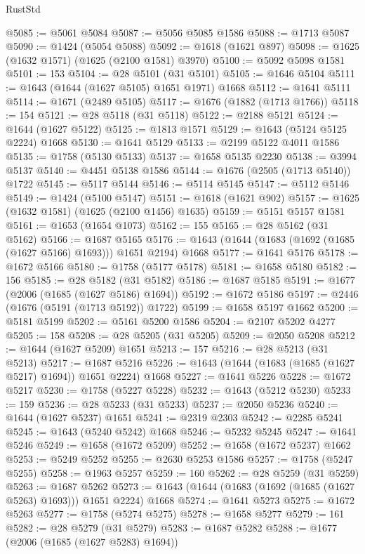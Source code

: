 \begin{lexlean}{RustStd}
\begin{coremodule}
@5085 := @5061 @5084
@5087 := @5056 @5085 @1586
@5088 := @1713 @5087
@5090 := @1424 (@5054 @5088)
@5092 := @1618 (@1621 @897)
@5098 := @1625 (@1632 @1571) (@1625 (@2100 @1581) @3970)
@5100 := @5092 @5098 @1581
@5101 := 153
@5104 := @28 @5101 (@31 @5101)
@5105 := @1646 @5104
@5111 := @1643 (@1644 (@1627 @5105) @1651 @1971) @1668
@5112 := @1641 @5111
@5114 := @1671 (@2489 @5105)
@5117 := @1676 (@1882 (@1713 @1766))
@5118 := 154
@5121 := @28 @5118 (@31 @5118)
@5122 := @2188 @5121
@5124 := @1644 (@1627 @5122)
@5125 := @1813 @1571
@5129 := @1643 (@5124 @5125 @2224) @1668
@5130 := @1641 @5129
@5133 := @2199 @5122 @4011 @1586
@5135 := @1758 (@5130 @5133)
@5137 := @1658 @5135 @2230
@5138 := @3994 @5137
@5140 := @4451 @5138 @1586
@5144 := @1676 (@2505 (@1713 @5140)) @1722
@5145 := @5117 @5144
@5146 := @5114 @5145
@5147 := @5112 @5146
@5149 := @1424 (@5100 @5147)
@5151 := @1618 (@1621 @902)
@5157 := @1625 (@1632 @1581) (@1625 (@2100 @1456) @1635)
@5159 := @5151 @5157 @1581
@5161 := @1653 (@1654 @1073)
@5162 := 155
@5165 := @28 @5162 (@31 @5162)
@5166 := @1687 @5165
@5176 := @1643 (@1644 (@1683 (@1692 (@1685 (@1627 @5166) @1693))) @1651 @2194) @1668
@5177 := @1641 @5176
@5178 := @1672 @5166
@5180 := @1758 (@5177 @5178)
@5181 := @1658 @5180
@5182 := 156
@5185 := @28 @5182 (@31 @5182)
@5186 := @1687 @5185
@5191 := @1677 (@2006 (@1685 (@1627 @5186) @1694))
@5192 := @1672 @5186
@5197 := @2446 (@1676 (@5191 (@1713 @5192)) @1722)
@5199 := @1658 @5197 @1662
@5200 := @5181 @5199
@5202 := @5161 @5200 @1586
@5204 := @2107 @5202 @4277
@5205 := 158
@5208 := @28 @5205 (@31 @5205)
@5209 := @2050 @5208
@5212 := @1644 (@1627 @5209) @1651
@5213 := 157
@5216 := @28 @5213 (@31 @5213)
@5217 := @1687 @5216
@5226 := @1643 (@1644 (@1683 (@1685 (@1627 @5217) @1694)) @1651 @2224) @1668
@5227 := @1641 @5226
@5228 := @1672 @5217
@5230 := @1758 (@5227 @5228)
@5232 := @1643 (@5212 @5230)
@5233 := 159
@5236 := @28 @5233 (@31 @5233)
@5237 := @2050 @5236
@5240 := @1644 (@1627 @5237) @1651
@5241 := @2319 @2303
@5242 := @2285 @5241
@5245 := @1643 (@5240 @5242) @1668
@5246 := @5232 @5245
@5247 := @1641 @5246
@5249 := @1658 (@1672 @5209)
@5252 := @1658 (@1672 @5237) @1662
@5253 := @5249 @5252
@5255 := @2630 @5253 @1586
@5257 := @1758 (@5247 @5255)
@5258 := @1963 @5257
@5259 := 160
@5262 := @28 @5259 (@31 @5259)
@5263 := @1687 @5262
@5273 := @1643 (@1644 (@1683 (@1692 (@1685 (@1627 @5263) @1693))) @1651 @2224) @1668
@5274 := @1641 @5273
@5275 := @1672 @5263
@5277 := @1758 (@5274 @5275)
@5278 := @1658 @5277
@5279 := 161
@5282 := @28 @5279 (@31 @5279)
@5283 := @1687 @5282
@5288 := @1677 (@2006 (@1685 (@1627 @5283) @1694))

\end{coremodule}
\end{lexlean}
